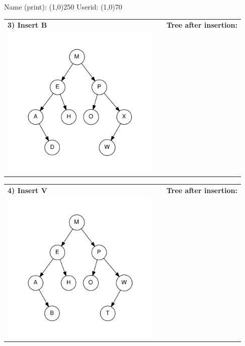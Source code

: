 \documentclass{article}
\begin{document}
\clearpage

\Large

\noindent Name (print): \line(1,0){250} \hspace{0.35in} Userid:
\line(1,0){70}

\vspace{0.25in}

\vspace{0.5in}

\noindent\begin{tabular}{lcc}
\bf 3) Insert B & & \bf Tree after insertion: \\
\includegraphics[width=3in]{avl-tree-3} & \hspace{0.5in} & \\
\end{tabular}

\vspace{1.5in}

\noindent\begin{tabular}{lcc}
\bf 4) Insert V & & \bf Tree after insertion: \\
\includegraphics[width=3in]{avl-tree-4} & \hspace{0.5in} & \\
\end{tabular}
\end{document}
